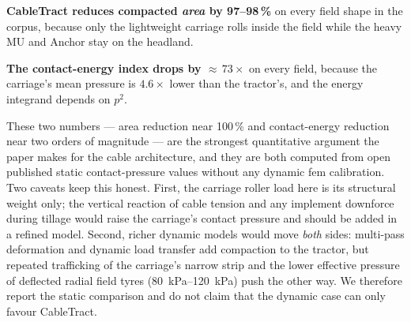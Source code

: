 \documentclass[11pt,a4paper]{article}
\begin{document}
\begin{table}[H]
\centering\small
\caption{Per-field compaction summary. The area reduction is geometric and field-dependent (only the carriage rolls inside the field). The contact-energy index reduction is a separate, per-vehicle running-gear quantity that combines the $4.6\times$ lower mean pressure (squared, ${\approx}21\times$) with the ${\approx}3.5\times$ smaller contact area, giving ${\approx}73\times$ identically on every field; it should not be multiplied by the area reduction.}\label{tab:compaction}
\end{table}

\textbf{CableTract reduces compacted \emph{area} by 97--98\,\%} on every field shape in the corpus, because only the lightweight carriage rolls inside the field while the heavy MU and Anchor stay on the headland.

\textbf{The contact-energy index drops by ${\approx}\,73\times$} on every field, because the carriage's mean pressure is $4.6\times$ lower than the tractor's, and the energy integrand depends on $p^{2}$.

These two numbers --- area reduction near 100\,\% and contact-energy reduction near two orders of magnitude --- are the strongest quantitative argument the paper makes for the cable architecture, and they are both computed from open published static contact-pressure values without any dynamic \gls{fem} calibration. Two caveats keep this honest. First, the carriage roller load here is its structural weight only; the vertical reaction of cable tension and any implement downforce during tillage would raise the carriage's contact pressure and should be added in a refined model. Second, richer dynamic models would move \emph{both} sides: multi-pass deformation and dynamic load transfer add compaction to the tractor, but repeated trafficking of the carriage's narrow strip and the lower effective pressure of deflected radial field tyres (\SIrange{80}{120}{\kilo\pascal}) push the other way. We therefore report the static comparison and do not claim that the dynamic case can only favour CableTract.
\end{document}
